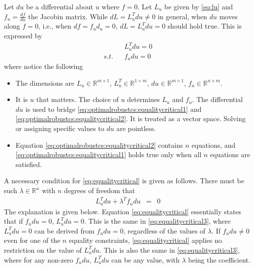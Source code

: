 Let $du$ be a differential about $u$ where $f = 0$. Let $L_u$ be given by \eqref{eq:lu} and $f_u = \frac{df}{du}$ the Jacobin matrix. While $dL = L_u^Tdu \neq 0$ in general, when $du$ moves along $f=0$, i.e., when $df = f_ud_u = 0$, $dL = L_u^Tdu = 0$ should hold true. This is expressed by
\begin{subequations} \label{eq:equalitycritical}
\begin{eqnarray}
	&& L_u^Tdu = 0 \label{eq:optimalrobustcs:equalitycritical1} \\
	\textit{s.t.} && f_udu = 0 \label{eq:optimalrobustcs:equalitycritical2}
\end{eqnarray}
\end{subequations}
where notice the following
\begin{itemize}
	\item The dimensions are $L_u \in \mathbb{R}^{m\times 1}$, $L_u^T \in \mathbb{R}^{1\times m}$, $du \in \mathbb{R}^{m\times 1}$, $f_u \in \mathbb{R}^{n\times m}$.
	\item It is $u$ that matters. The choice of $u$ determines $L_u$ and $f_u$. The differential $du$ is used to bridge \eqref{eq:optimalrobustcs:equalitycritical1} and \eqref{eq:optimalrobustcs:equalitycritical2}. It is treated as a vector space. Solving or assigning specific values to $du$ are pointless.
	\item Equation \eqref{eq:optimalrobustcs:equalitycritical2} contains $n$ equations, and \eqref{eq:optimalrobustcs:equalitycritical1} holds true only when all $n$ equations are satisfied.
\end{itemize}

A necessary condition for \eqref{eq:equalitycritical} is given as follows. There must be such $\lambda \in \mathbb{R}^n$ with $n$ degrees of freedom that
\begin{eqnarray}
	L_u^Tdu + \lambda^T f_udu &=& 0 \label{eq:equalitycritical3}
\end{eqnarray}
The explanation is given below. Equation \eqref{eq:equalitycritical} essentially states that if $f_udu = 0$, $L_u^Tdu = 0$. This is the same in \eqref{eq:equalitycritical3}, where $L_u^Tdu = 0$ can be derived from $f_udu = 0$, regardless of the values of $\lambda$. If $f_udu \neq 0$ even for one of the $n$ equality constraints, \eqref{eq:equalitycritical} applies no restriction on the value of $L_u^Tdu$. This is also the same in \eqref{eq:equalitycritical3}, where for any non-zero $f_udu$, $L_u^Tdu$ can be any value, with $\lambda$ being the coefficient.

